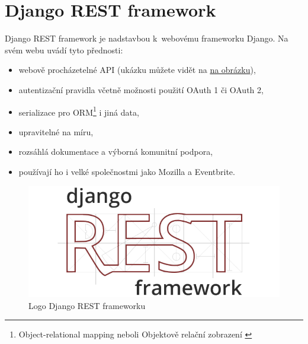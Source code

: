\section{\texorpdfstring{Django REST framework \label{drf:fra}}{Django REST framework }}\label{django-rest-framework}

Django REST framework je nadstavbou k~webovému frameworku Django. Na svém webu \autocite{djangorest} uvádí tyto přednosti:

\begin{itemize}
\tightlist
\item
  webově procházetelné API (ukázku můžete vidět na \protect\hyperlink{pic:djangorestbrowsable}{na obrázku}),
\item
  autentizační pravidla včetně možnosti použití OAuth 1 či OAuth 2,
\item
  serializace pro ORM\footnote{Object-relational mapping neboli Objektově relační zobrazení \autocite{ormbook}} i jiná data,
\item
  upravitelné na míru,
\item
  rozsáhlá dokumentace a výborná komunitní podpora,
\item
  používají ho i velké společnostmi jako Mozilla a Eventbrite.
\end{itemize}

\begin{figure}
\centering
\includegraphics{images/django-rest-framework}
\caption{Logo Django REST frameworku \autocite{djangorest}\label{pic:djangorest}}
\end{figure}

